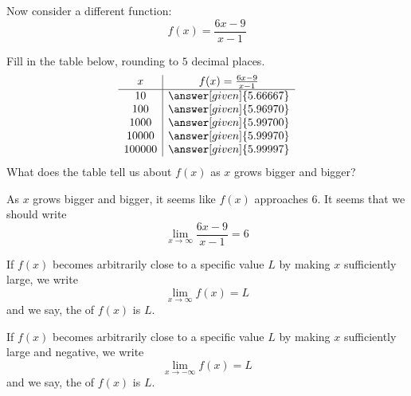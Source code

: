 \documentclass{ximera}
\begin{document}
\begin{example}
  Now consider a different function:
  \[
  f(x) = \frac{6x-9}{x-1}
  \]
  \begin{image}
  \end{image}
  Fill in the table below, rounding to $5$ decimal places.
  \[
  \begin{array}{c|c}
    x      & f(x)=\frac{6x-9}{x-1} \\ \hline
    10     & \answer[given]{5.66667}\\
    100    & \answer[given]{5.96970}\\
    1000   & \answer[given]{5.99700}\\
    10000  & \answer[given]{5.99970}\\
    100000 & \answer[given]{5.99997}\\
  \end{array}
  \]
  What does the table tell us about $f(x)$ as $x$ grows bigger and bigger?
  \begin{explanation}
    As $x$ grows bigger and bigger, it seems like $f(x)$ approaches $6$.
    It seems that we should write
    \[
    \lim_{x\to \infty}\frac{6x-9}{x-1}=6 
    \]
  \end{explanation}
\end{example}

\begin{definition}\label{def:limitAtInfty}
If $f(x)$ becomes arbitrarily close to a specific value $L$ by making
$x$ sufficiently large, we write
\[
\lim_{x\to \infty} f(x) = L
\]
and we say, the  of $f(x)$ is $L$.  

If $f(x)$ becomes arbitrarily close to a specific value $L$ by making
$x$ sufficiently large and negative, we write
\[
\lim_{x \to -\infty} f(x) = L
\]
and we say, the  of $f(x)$ is $L$.  
\end{definition}
\end{document}
